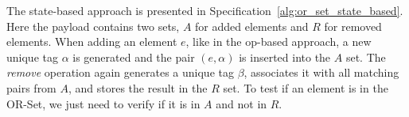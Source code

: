 The state-based approach is presented in
Specification~\ref{alg:or_set_state_based}. Here the payload contains two sets,
$A$ for added elements and $R$ for removed elements. When adding an element $e$,
like in the op-based approach, a new unique tag $\alpha$ is generated and the
pair $(e, \alpha)$ is inserted into the $A$ set. The \textit{remove} operation
again generates a unique tag $\beta$, associates it with all matching pairs from
$A$, and stores the result in the $R$ set. To test if an element is in the
OR-Set, we just need to verify if it is in $A$ and not in $R$.
